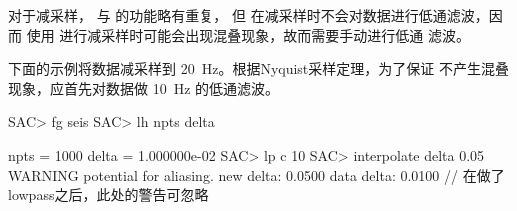 对于减采样， 与  的功能略有重复，
但  在减采样时不会对数据进行低通滤波，因而
使用  进行减采样时可能会出现混叠现象，故而需要手动进行低通
滤波。

下面的示例将数据减采样到 \SI{20}{\Hz}。根据Nyquist采样定理，为了保证
不产生混叠现象，应首先对数据做 \SI{10}{\Hz} 的低通滤波。
\begin{SACCode}
SAC> fg seis
SAC> lh npts delta

     npts = 1000
     delta = 1.000000e-02
SAC> lp c 10
SAC> interpolate delta 0.05
WARNING potential for aliasing. new delta: 0.0500 data delta: 0.0100
    //  在做了lowpass之后，此处的警告可忽略
\end{SACCode}
